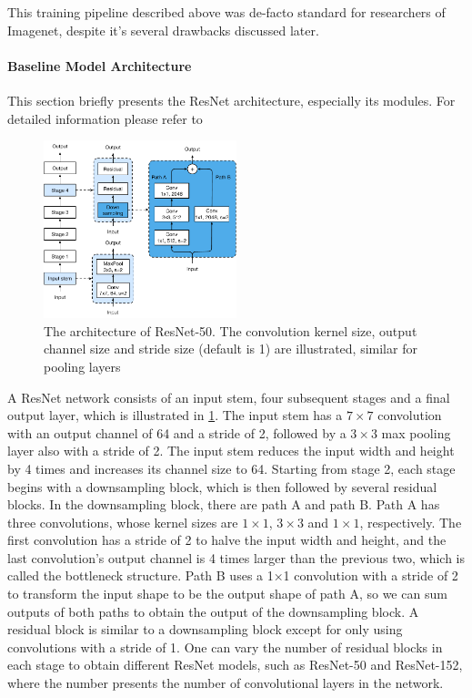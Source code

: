 This training pipeline described above was de-facto standard for researchers of Imagenet, despite it's several drawbacks discussed later. 

\paragraph{Baseline Model Architecture}
This section briefly presents the ResNet architecture, especially its modules. For detailed information please refer to \cite{he2016deep_resnetv1}


\begin{figure}[h!]
    \caption{The architecture of ResNet-50. The convolution kernel size, output channel size and stride size (default is 1) are illustrated, similar for pooling layers}
    \label{fig: resnet-a}
    \includegraphics[width=0.5\textwidth]{images/resnet-a.pdf}
  \end{figure}


A ResNet network consists of an input stem, four subsequent stages and a final output layer, which is illustrated in \ref{fig: resnet-a}. The input stem has a $7 \times 7$ convolution with an output channel of 64 and a stride of 2, followed by a $3 \times 3$ max pooling layer also with a stride of 2. The input stem reduces the input width and height by 4 times and increases its channel size to 64. 
Starting from stage 2, each stage begins with a downsampling block, which is then followed by several residual blocks. In the downsampling block, there are path A and path B. Path A has three convolutions, whose kernel sizes are $1 \times 1$, $3 \times 3$ and $1 \times 1$, respectively. The first convolution has a stride of 2 to halve the input width and height, and the last convolution’s output channel is 4 times larger than the previous two, which is called the bottleneck structure. Path B uses a 1×1 convolution with a stride of 2 to transform the input shape to be the output shape of path A, so we can sum outputs of both paths to obtain the output of the downsampling block. A residual block is similar to a downsampling block except for only using convolutions with a stride of 1.
One can vary the number of residual blocks in each stage to obtain different ResNet models, such as ResNet-50 and ResNet-152, where the number presents the number of convolutional layers in the network.


